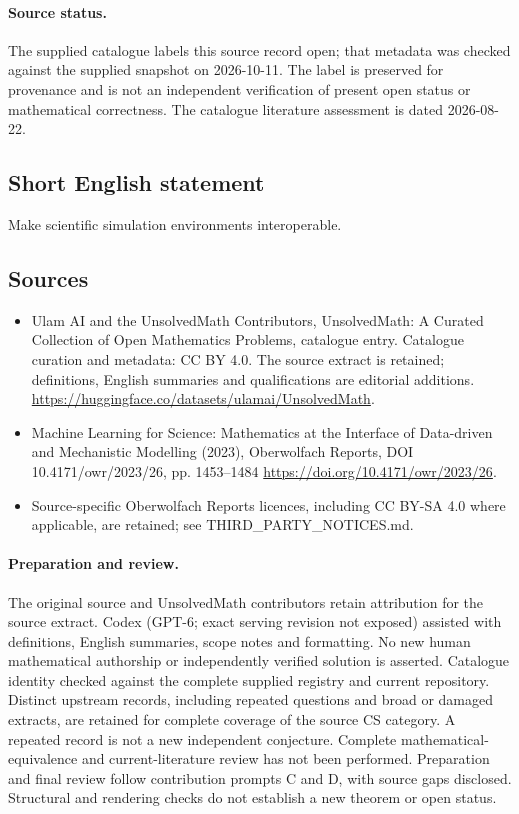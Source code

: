 \documentclass[11pt]{article}
\begin{document}
\paragraph{Source status.}
The supplied catalogue labels this source record open; that metadata was checked against the supplied snapshot on 2026-10-11. The label is preserved for provenance and is not an independent verification of present open status or mathematical correctness. The catalogue literature assessment is dated 2026-08-22.
\subsection{Short English statement}
Make scientific simulation environments interoperable.
\subsection{Sources}
\begin{itemize}
\item[S1] Ulam AI and the UnsolvedMath Contributors, UnsolvedMath: A Curated Collection of Open Mathematics Problems, catalogue entry. Catalogue curation and metadata: CC BY 4.0. The source extract is retained; definitions, English summaries and qualifications are editorial additions.
\url{https://huggingface.co/datasets/ulamai/UnsolvedMath}.
\item[S2] Machine Learning for Science: Mathematics at the Interface of Data-driven and Mechanistic Modelling (2023), Oberwolfach Reports, DOI 10.4171/owr/2023/26, pp. 1453--1484
\url{https://doi.org/10.4171/owr/2023/26}.
\item Source-specific Oberwolfach Reports licences, including CC BY-SA 4.0 where applicable, are retained; see THIRD\_PARTY\_NOTICES.md.
\end{itemize}
\paragraph{Preparation and review.}
The original source and UnsolvedMath contributors retain attribution for the source extract. Codex (GPT-6; exact serving revision not exposed) assisted with definitions, English summaries, scope notes and formatting. No new human mathematical authorship or independently verified solution is asserted. Catalogue identity checked against the complete supplied registry and current repository. Distinct upstream records, including repeated questions and broad or damaged extracts, are retained for complete coverage of the source CS category. A repeated record is not a new independent conjecture. Complete mathematical-equivalence and current-literature review has not been performed. Preparation and final review follow contribution prompts C and D, with source gaps disclosed. Structural and rendering checks do not establish a new theorem or open status.
\label{end:statement}
\end{document}
